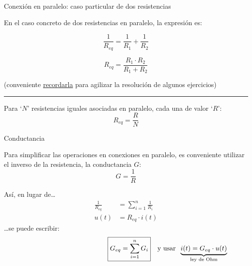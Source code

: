\documentclass[aspectratio=169, xcolor={usenames,svgnames,dvipsnames}]{beamer}
\begin{document}

\begin{frame}{Conexión en paralelo: \hspace{3mm} caso particular de dos resistencias}  \label{diapo:2R_paralelo}

    \vspace{5mm}
    En el caso concreto de \alert{dos resistencias en paralelo}, la expresión es:
    
    \begin{equation*}
      \frac{1}{R_{eq}} = \frac{1}{R_1} + \frac{1}{R_2}
    \end{equation*}
    
    \begin{equation*}
      \boxed{R_{eq} = \frac{R_1 \cdot R_2}{R_1 + R_2}}
    \end{equation*}
    
    \centering \small{(conveniente \underline{recordarla} para agilizar la resolución de algunos ejercicios)}

    \vspace{2mm}
    
    \noindent\rule{\textwidth}{0.5pt}

    \vspace{2mm}

    Para `$N$' \alert{resistencias iguales} asociadas en paralelo, cada una de valor `$R$': 
    \[
        R_{eq} = \frac{R}{N}
    \]
\end{frame}


\begin{frame}{Conductancia}

    \vspace{4mm}
    Para \alert{simplificar las operaciones} en conexiones en paralelo, es conveniente utilizar el inverso de la resistencia, la \alert{conductancia} $G$:
    \vspace{2mm}
    \begin{equation*}
      G = \frac{1}{R}
    \end{equation*}
    
    Así, en lugar de\ldots{}
    \vspace{-2mm}
    \begin{align*}
      \frac{1}{R_{eq}} &= \sum_{i = 1}^n \frac{1}{R_i}\\[7pt]
      u(t) &= R_{eq} \cdot i(t)
    \end{align*}
    \ldots{}se puede escribir:
    \begin{equation*}
      \hspace{43mm} \boxed{G_{eq} = \sum_{i = 1}^n G_i} \quad \textrm{y usar} \;\; \underbrace{i(t) = G_{eq} \cdot u(t)}_{\text{ley de Ohm}}
    \end{equation*}
\end{frame}
\end{document}
